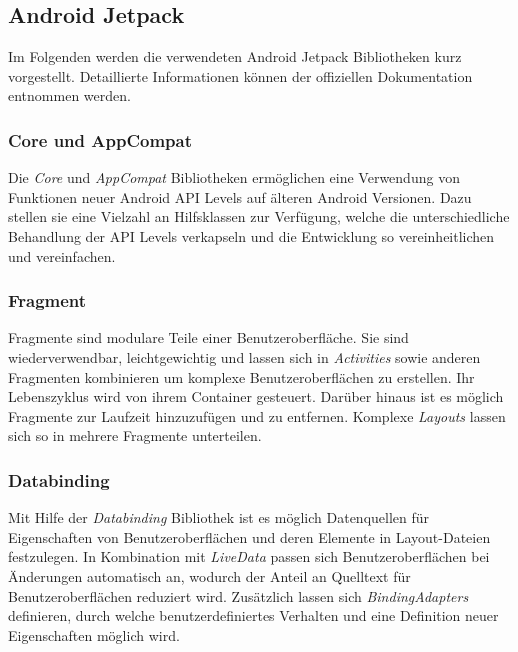 \documentclass[a4paper, 11pt]{article}
\begin{document}

\subsection{Android Jetpack}
\label{subsec:app:jetpack}
Im Folgenden werden die verwendeten Android Jetpack Bibliotheken kurz vorgestellt. Detaillierte Informationen können der offiziellen Dokumentation entnommen werden.

\subsubsection{Core und AppCompat}
\label{subsubsec:app:jetpack:base}
Die \textit{Core} und \textit{AppCompat} Bibliotheken ermöglichen eine Verwendung von Funktionen neuer Android API Levels auf älteren Android Versionen.
Dazu stellen sie eine Vielzahl an Hilfsklassen zur Verfügung, welche die unterschiedliche Behandlung der API Levels verkapseln und die Entwicklung so vereinheitlichen und vereinfachen.

\subsubsection{Fragment}
\label{subsubsec:app:jetpack:fragment}
Fragmente sind modulare Teile einer Benutzeroberfläche.
Sie sind wiederverwendbar, leichtgewichtig und lassen sich in \textit{Activities} sowie anderen Fragmenten kombinieren um komplexe Benutzeroberflächen zu erstellen.
Ihr Lebenszyklus wird von ihrem Container gesteuert. %
Darüber hinaus ist es möglich Fragmente zur Laufzeit hinzuzufügen und zu entfernen.
Komplexe \textit{Layouts} lassen sich so in mehrere Fragmente unterteilen. %

\subsubsection{Databinding}
\label{subsubsec:app:jetpack:databinding}
Mit Hilfe der \textit{Databinding} Bibliothek ist es möglich Datenquellen für Eigenschaften von Benutzeroberflächen und deren Elemente in Layout-Dateien festzulegen.
In Kombination mit \textit{LiveData} passen sich Benutzeroberflächen bei Änderungen automatisch an, wodurch der Anteil an Quelltext für Benutzeroberflächen reduziert wird.
Zusätzlich lassen sich \textit{BindingAdapters} definieren, durch welche benutzerdefiniertes Verhalten und eine Definition neuer Eigenschaften möglich wird.
\end{document}
